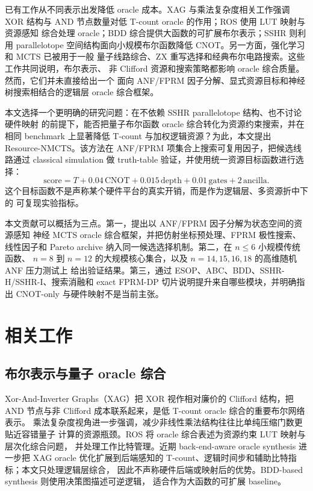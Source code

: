 \documentclass[UTF8,fontset=macnew,11pt]{ctexart}
\newcommand{\method}{Resource-NMCTS}
\newcommand{\score}{\mathrm{score}}
\begin{document}
已有工作从不同表示出发降低 oracle 成本。XAG 与乘法复杂度相关工作强调 XOR
结构与 AND 节点数量对低 T-count oracle 的作用；ROS 使用 LUT 映射与资源感知
综合处理 oracle；BDD 综合提供大函数的可扩展布尔表示；SSHR 则利用 parallelotope
空间结构面向小规模布尔函数降低 CNOT。另一方面，强化学习和 MCTS 已被用于一般
量子线路综合、ZX 重写选择和经典布尔电路搜索。这些工作共同说明，布尔表示、
非 Clifford 资源和搜索策略都影响 oracle 综合质量。然而，它们并未直接给出一个
面向 ANF/FPRM 因子分解、显式资源目标和神经树搜索相结合的逻辑层 oracle 综合框架。

本文选择一个更明确的研究问题：在不依赖 SSHR parallelotope 结构、也不讨论硬件映射
的前提下，能否把量子布尔函数 oracle 综合转化为资源约束搜索，并在相同 benchmark
上显著降低 T-count 与加权逻辑资源？为此，本文提出 \method{}。该方法在 ANF/FPRM
项集合上搜索可复用因子，把候选线路通过 classical simulation 做 truth-table
验证，并使用统一资源目标函数进行选择：
\begin{equation}
\score = T + 0.04\,\mathrm{CNOT} + 0.015\,\mathrm{depth}
       + 0.01\,\mathrm{gates} + 2\,\mathrm{ancilla}.
\end{equation}
这个目标函数不是声称某个硬件平台的真实开销，而是作为逻辑层、多资源折中下的
可复现实验指标。

本文贡献可以概括为三点。第一，提出以 ANF/FPRM 因子分解为状态空间的资源感知
神经 MCTS oracle 综合框架，并把仿射坐标预处理、FPRM 极性搜索、线性因子和
Pareto archive 纳入同一候选选择机制。第二，在 $n\leq 6$ 小规模传统函数、
$n=8$ 到 $n=12$ 的大规模核心集合，以及 $n=14,15,16,18$ 的高维随机 ANF 压力测试上
给出验证结果。第三，通过 ESOP、ABC、BDD、SSHR-H/SSHR-I、搜索消融和 exact FPRM-DP
切片说明提升来自哪些模块，并明确指出 CNOT-only 与硬件映射不是当前主张。

\section{相关工作}

\subsection{布尔表示与量子 oracle 综合}

Xor-And-Inverter Graphs（XAG）把 XOR 视作相对廉价的 Clifford 结构，把 AND
节点与非 Clifford 成本联系起来，是低 T-count oracle 综合的重要布尔网络表示。
乘法复杂度视角进一步强调，减少非线性乘法结构往往比单纯压缩门数更贴近容错量子
计算的资源瓶颈。ROS 将 oracle 综合表述为资源约束 LUT 映射与层次化综合问题，
并处理工作比特管理。近期 back-end-aware oracle synthesis 进一步把 XAG oracle
优化扩展到后端感知的 T-count、逻辑时间步和辅助比特指标；本文只处理逻辑层综合，
因此不声称硬件后端或映射后的优势。BDD-based synthesis 则使用决策图描述可逆逻辑，
适合作为大函数的可扩展 baseline。
\end{document}
